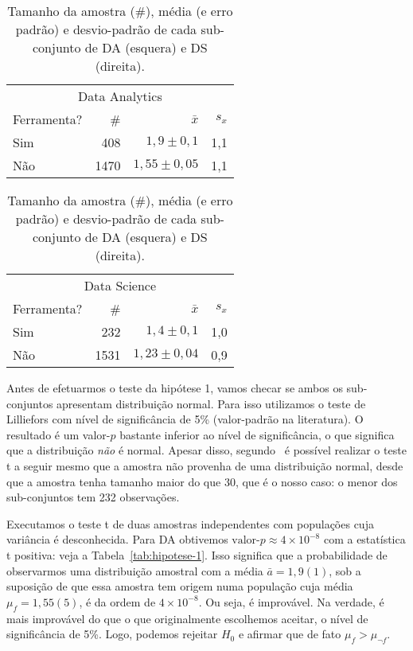 \begin{table}
	\caption{Tamanho da amostra (\#), média (e erro padrão) e desvio-padrão de cada sub-conjunto de DA (esquera) e DS (direita).}
	\label{tab:dist-hipotese-1}
	\begin{minipage}{0.45\textwidth}
		\begin{tabular}{lrrr}
			\toprule
			\multicolumn{4}{c}{Data Analytics}\\
			Ferramenta? & \# & $\bar{x}$ & $s_x$ \\
			\midrule
			Sim &  408 & $1,9\pm 0,1$ & 1,1 \\
			Não & 1470 & $1,55 \pm 0,05$ & 1,1 \\
			\bottomrule
		\end{tabular}
	\end{minipage}\hfill
	\begin{minipage}{0.45\textwidth}
		\begin{tabular}{lrrr}
			\toprule
			\multicolumn{4}{c}{Data Science}\\
			Ferramenta? & \# & $\bar{x}$ & $s_x$ \\
			\midrule
			Sim &  232 & $1,4\pm 0,1$ & 1,0 \\
			Não & 1531 & $1,23\pm 0,04$ & 0,9 \\
			\bottomrule
		\end{tabular}
	\end{minipage}
\end{table}

Antes de efetuarmos o teste da hipótese 1, vamos checar se ambos os sub-conjuntos apresentam distribuição normal.
Para isso utilizamos o teste de Lilliefors com nível de significância de 5\% (valor-padrão na literatura).
O resultado é um valor-$p$ bastante inferior ao nível de significância, o que significa que a distribuição \emph{não} é normal.
Apesar disso, segundo~\cite[p.~259]{Triola2005} é possível realizar o teste t a seguir mesmo que a amostra não provenha de uma distribuição normal, desde que a amostra tenha tamanho maior do que 30, que é o nosso caso: o menor dos sub-conjuntos tem 232 observações.

Executamos o teste t de duas amostras independentes com populações cuja variância é desconhecida.
Para DA obtivemos $\text{valor-}p \approx 4\times10^{-8}$ com a estatística t positiva: veja a Tabela~\ref{tab:hipotese-1}.
Isso significa que a probabilidade de observarmos uma distribuição amostral com a média $\bar a = 1,9(1)$, sob a suposição de que essa amostra tem origem numa população cuja média $\mu_f = 1,55(5)$, é da ordem de $4\times10^{-8}$.
Ou seja, é improvável.
Na verdade, é mais improvável do que o que originalmente escolhemos aceitar, o nível de significância de 5\%.
Logo, podemos rejeitar $H_0$ e afirmar que de fato $\mu_{f} > \mu_{\neg f}$.

